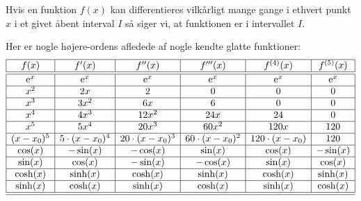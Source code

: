 \begin{definition}
Hvis en funktion $f(x)$  kan differentieres vilkårligt mange gange i ethvert punkt $x$ i et givet åbent interval $I$ så siger vi, at funktionen er  i intervallet $I$.
\end{definition}

\begin{example} \label{exampDiffn}
Her er nogle højere-ordens afledede af nogle kendte glatte funktioner:
\begin{equation}
\begin{array}{|c|c|c|c|c|c|}
  \hline
  f(x) & f'(x) & f''(x) & f'''(x) & f^{(4)}(x) & f^{(5)}(x) \\ \hline \hline
  \mathrm{e}^{x} & \mathrm{e}^{x} & \mathrm{e}^{x}& \mathrm{e}^{x}&\mathrm{e}^{x} & \mathrm{e}^{x} \\ \hline
  x^{2} & 2x & 2& 0& 0 & 0 \\ \hline
  x^{3} & 3x^{2}& 6x & 6 & 0 &0 \\ \hline
  x^{4} & 4x^{3}& 12x^{2} & 24x & 24 & 0 \\ \hline
  x^{5} & 5x^{4}& 20x^{3} & 60x^{2} & 120x & 120 \\ \hline
  (x-x_{0})^{5} & 5\cdot(x-x_{0})^{4}& 20\cdot(x-x_{0})^{3} & 60\cdot(x-x_{0})^{2} & 120\cdot(x-x_{0}) & 120 \\ \hline
  \cos(x) & -\sin(x) & -\cos(x) & \sin(x) & \cos(x) & -\sin(x)\\ \hline
  \sin(x) & \cos(x) & -\sin(x) & -\cos(x) & \sin(x) & \cos(x)\\ \hline
  \cosh(x) & \sinh(x) &  \cosh(x) & \sinh(x)&  \cosh(x) & \sinh(x)\\ \hline
  \sinh(x) &  \cosh(x) & \sinh(x)&  \cosh(x) & \sinh(x)& \cosh(x) \\ \hline
  \hline
\end{array}
\end{equation}
\end{example}

